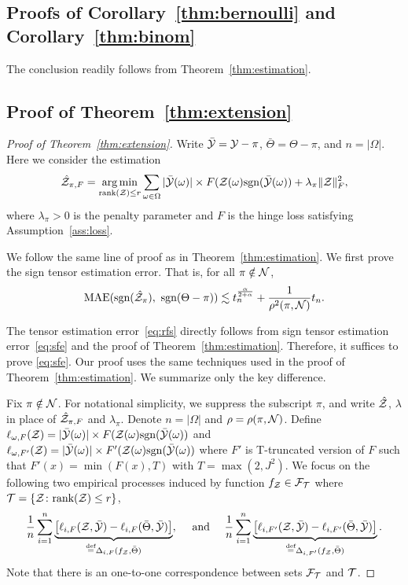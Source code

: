 \documentclass[twoside,11pt]{article}
\theoremstyle{definition}
\newcommand*{\KeepStyleUnderBrace}[1]{%
  \mathop{%
    \mathchoice
    {\underbrace{\displaystyle#1}}%
    {\underbrace{\textstyle#1}}%
    {\underbrace{\scriptstyle#1}}%
    {\underbrace{\scriptscriptstyle#1}}%
  }\limits
}
\def\sign{\textup{sgn}}
\def\rank{\textup{rank}}
\begin{document}
\subsection{Proofs of Corollary~\ref{thm:bernoulli} and Corollary~\ref{thm:binom}}
The conclusion readily follows from Theorem~\ref{thm:estimation}. 

\subsection{Proof of Theorem~\ref{thm:extension}}
\begin{proof}[Proof of Theorem~\ref{thm:extension}]
Write $\bar {\mathcal{Y}}=\mathcal{Y}-\pi$, $\bar \Theta=\Theta-\pi$, and $n=|\Omega|$. Here we consider the estimation 
 \begin{align}\label{eq:largemgopt}
  \hat\tZ_{\pi,F} = \argmin_{\text{rank}(\tZ)\leq r}\sum_{\omega\in\Omega} |\bar\tY(\omega)|\times F(\tZ(\omega)\sign(\bar \tY(\omega))+\lambda_\pi\FnormSize{}{\tZ}^2,
 \end{align}
 where $\lambda_\pi>0$ is the penalty parameter and $F$ is the hinge loss satisfying Assumption~\ref{ass:loss}. 
 
 We follow the same line of proof as in Theorem~\ref{thm:estimation}. We first prove the sign tensor estimation error. That is, for all $\pi \notin \mathcal{N}$, 
\begin{equation}\label{eq:sfe}
\textup{MAE}(\sign(\hat \tZ_\pi),\ \sign(\Theta-\pi)) \lesssim t_n ^{\alpha\over 2+\alpha}+{1\over \rho^2(\pi,\tN)}t_n.
\end{equation}
 
The tensor estimation error~\eqref{eq:rfs} directly follows from sign tensor estimation error~\eqref{eq:sfe} and the proof of Theorem~\ref{thm:estimation}.
Therefore, it suffices to prove \eqref{eq:sfe}. Our  proof uses the same techniques used in the proof of  Theorem~\ref{thm:estimation}. We summarize only the key difference.

Fix $\pi\notin\mathcal{N}$. For notational simplicity, we suppress the subscript $\pi$, and write $\hat {\mathcal{Z}}$, $\lambda$ in place of $\hat {\mathcal{Z}}_{\pi,F}$ and $\lambda_\pi$. Denote $n=|\Omega|$ and $\rho=\rho(\pi, \mathcal{N})$.  
Define $\ell_{\omega,F}(\tZ) =  |\bar\tY(\omega)|\times F(\tZ(\omega)\sign(\bar \tY(\omega))$ and $\ell_{\omega,F'}(\tZ) =  |\bar\tY(\omega)|\times F'(\tZ(\omega)\sign(\bar \tY(\omega))$ where $F'$ is T-truncated version of $F$ such that $F'(x) =  \min(F(x),T)$ with $T=\max(2,J^2)$.  
We focus on the following two empirical processes induced by function $f_{\mathcal{Z}}\in \mathcal{F}_{\mathcal{T}}$ where $\tT=\{\tZ\colon \rank(\tZ)\leq r\}$,
\begin{align}\label{eq:empirical}
{1\over n}\sum_{i=1}^n \KeepStyleUnderBrace{\left[\ell_{i,F}(\tZ, \bar \tY)-\ell_{i,F}(\bar \Theta, \bar \tY)\right]}_{\stackrel{\text{def}}{=}\Delta_{i,F}(f_\tZ, \bar\Theta)},\quad\text { and }\quad  {1\over n}\sum_{i=1}^n \KeepStyleUnderBrace{\left[\ell_{i,F'}(\tZ, \bar \tY)-\ell_{i,F'}(\bar \Theta, \bar \tY)\right]}_{\stackrel{\text{def}}{=}\Delta_{i,F'}(f_\tZ, \bar\Theta)}.
\end{align}
Note that there is an one-to-one correspondence between sets $\mathcal{F}_{\mathcal{T}}$ and $\mathcal{T}$. 


\end{proof}
\end{document}
